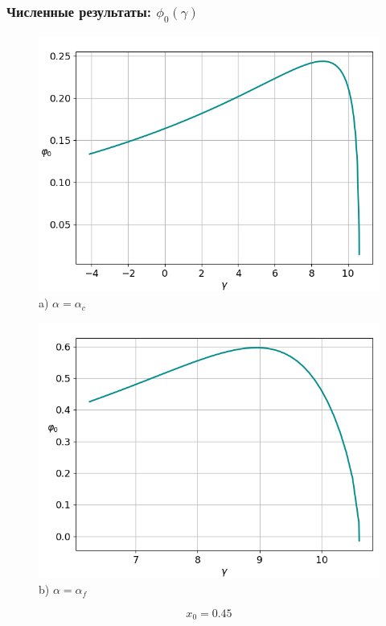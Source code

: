 \documentclass[fullscreen=true, unicode, bookmarks=false]{beamer}
\begin{document}
\begin{frame}
\frametitle{ Численные результаты: $ \phi_0(\gamma) $ }

\begin{figure} 
\begin{minipage}[h]{0.49\linewidth}
\begin{center}
\includegraphics[scale=0.32]{oscillating_phi0_x0_045.png} \\ {\scriptsize a) $ \alpha = \alpha_c $}
\end{center}
\end{minipage} 
\hfill
\begin{minipage}[h]{0.49\linewidth}
\begin{center}
\includegraphics[scale=0.32]{oscillating_phi0_after_tangent_x0_045.png}  \\ {\scriptsize b) $ \alpha = \alpha_f $}
\end{center}
\end{minipage} 
\end{figure}

$$ x_0 = 0.45 $$

\end{frame}
\end{document}
